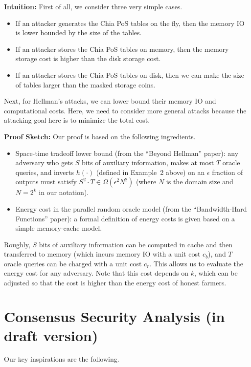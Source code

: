 \documentclass[12pt,draftcls,onecolumn]{IEEEtran}
\begin{document}
{\bf Intuition:} First of all, we consider three very simple cases.
\begin{itemize}
    \item If an attacker generates the Chia PoS tables on the fly, then the memory IO is lower bounded by the size of the tables.
    \item If an attacker stores the Chia PoS tables on memory, then the memory storage cost is higher than the disk storage cost.
    \item If an attacker stores the Chia PoS tables on disk, then we can make the size of tables larger than the masked storage coins.
\end{itemize}

Next, for Hellman's attacks, we can lower bound their memory IO and computational costs.
Here, we need to consider more general attacks because the attacking goal here is to minimize the total cost.

{\bf Proof Sketch:} Our proof is based on the following ingredients. 

\begin{itemize}
    \item Space-time tradeoff lower bound (from the ``Beyond Hellman'' paper): 
    any adversary who gets $S$ bits of auxiliary information, makes at most $T$
    oracle queries, and inverts $h(\cdot)$ (defined in Example~2 above) on an
    $\epsilon$ fraction of outputs must satisfy $S^2 \cdot T \in \Omega(\epsilon^2 N^2)$ (where $N$
    is the domain size and $N = 2^k$ in our notation).
    \item Energy cost in the parallel random oracle model (from the ``Bandwidth-Hard Functions'' paper): a formal definition of energy costs is given based on a simple memory-cache model.
\end{itemize}

Roughly, $S$ bits of auxiliary information can be computed in cache and then transferred to memory (which incurs memory IO with a unit cost $c_b$), and $T$ oracle queries can be charged with a unit cost $c_r$.
This allows us to evaluate the energy cost for any adversary. Note that this cost depends on $k$, which can be adjusted so that the cost is higher than the energy cost of honest farmers.

\section{Consensus Security Analysis (in draft version)}

Our key inspirations are the following.
\end{document}
